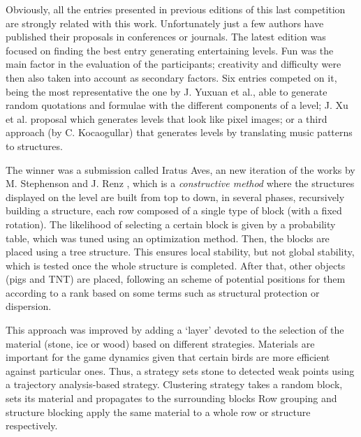 \documentclass[sigconf]{acmart}
\begin{document}
Obviously, all the entries presented in previous editions of this last
competition are strongly related with this
work. Unfortunately just a few  authors have published their
proposals in conferences or journals. The latest edition
\cite{AngryBirds_LevelGeneration_18} was focused on finding the best 
entry generating entertaining levels. Fun was the main factor in the
evaluation of the participants;  creativity and difficulty were then
also taken into account as secondary factors. 
Six entries competed on it, being the most representative the one by
J. Yuxuan et al., able to generate random quotations and formulae with
the different components of a level; J. Xu et al. proposal which
generates levels that look like pixel images; or a third approach (by
C. Kocaogullar) that generates levels by translating music patterns to
structures. %

The winner was a submission called Iratus Aves, an new iteration of
the works by M. Stephenson and J. Renz
\cite{stephenson2017generating,stephenson2016procedural}, which is a
\textit{constructive method} where the structures displayed on the
level are built from top to down, in several phases, recursively
building a structure, each row composed of a single type of block
(with a fixed rotation). The likelihood of selecting a certain block
is given by a probability table, which was tuned using an optimization
method. Then, the blocks are placed using a tree structure.
This ensures local stability, but not global stability, which
is tested once the whole structure is completed.  
After that, other objects (pigs and TNT) are placed, following an
scheme of potential positions for them according to a rank based on
some terms such as structural protection or dispersion. 

This approach was improved by adding a `layer' devoted to the
selection of the material (stone, ice or wood) based on different
strategies. Materials are important for the game dynamics given that certain birds are more
efficient against particular ones.
Thus, a strategy sets stone to detected weak
points using a trajectory analysis-based strategy.
Clustering strategy takes a random block, sets its material and
propagates to the surrounding blocks
Row grouping and structure blocking apply the same material to a
whole row or structure respectively. 
\end{document}
